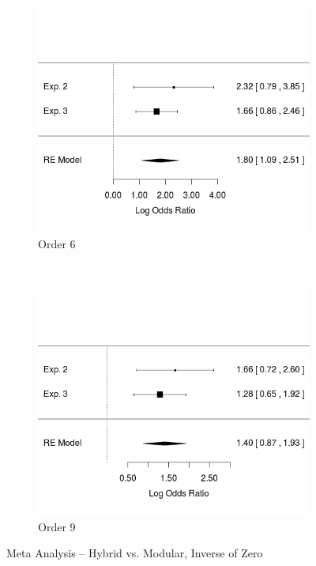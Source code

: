 \documentclass[11pt]{article}
\begin{document}
\begin{figure}[H]
\centering
\begin{subfigure}[c]{0.4\textwidth}
\centering
\includegraphics[width=\textwidth]{figures/meta/h_in_Z_6.png}
\caption{Order 6}
\end{subfigure}
~
\begin{subfigure}[c]{0.4\textwidth}
\centering
\includegraphics[width=\textwidth]{figures/meta/h_in_Z_9.png}
\caption{Order 9}
\end{subfigure}
\caption{Meta Analysis -- Hybrid vs. Modular, Inverse of Zero}
\label{meta_inZ_h}
\end{figure}\noindent 
\end{document}
